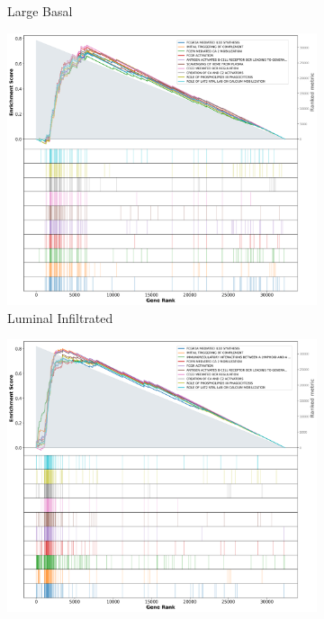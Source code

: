 \begin{appendices}
\begin{figure}[!h]
\begin{subfigure}[!t]{0.4\textwidth}
        \caption{Large Basal}
        \label{fig:ap:gsea_largeBasal}
    \end{subfigure} 
    \begin{subfigure}[!t]{0.4\textwidth}
        \centering
        \includegraphics[width=\textwidth,keepaspectratio]{Sections/Network_I/Resources/selective_pruning/gsea/lumInf_10_top_manTerms.png}
        \caption{Luminal Infiltrated}
        \label{fig:ap:gsea_lumInf}
    \end{subfigure}
    \begin{subfigure}[!t]{0.4\textwidth}
        \centering
        \includegraphics[width=\textwidth,keepaspectratio]{Sections/Network_I/Resources/selective_pruning/gsea/mesLike_10_top_manTerms.png}

\end{subfigure}
\end{figure}
\end{appendices}
